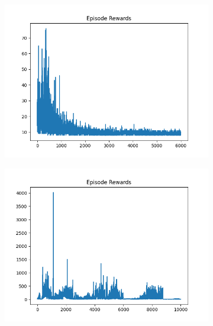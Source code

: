 \begin{figure}[H]
    \centering
    \begin{subfigure}{.47\linewidth}
        \centering
        \includegraphics[width=\textwidth]{pole/2024-06-14_18-54-27_dqn_cartpole_episode_rewards.png}
    \end{subfigure}
    \begin{subfigure}{.47\linewidth}
        \centering
        \includegraphics[width=\textwidth]{pole/2024-06-13_18-42-33_dqn_cartpole_episode_rewards.png}
    \end{subfigure}
    \begin{subfigure}{.47\linewidth}
        \centering

\end{subfigure}
\end{figure}
